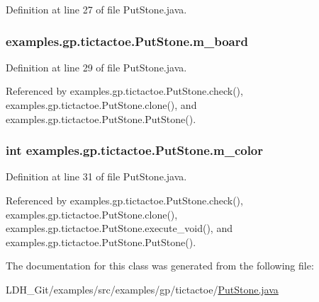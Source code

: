 Definition at line 27 of file Put\-Stone.\-java.

\hypertarget{classexamples_1_1gp_1_1tictactoe_1_1_put_stone_a2247515eb23f68385264f0d1a10c12cd}{
\subsubsection[{m\-\_\-board}]{ examples.\-gp.\-tictactoe.\-Put\-Stone.\-m\-\_\-board\hspace{0.3cm}{\ttfamily [private]}}}\label{classexamples_1_1gp_1_1tictactoe_1_1_put_stone_a2247515eb23f68385264f0d1a10c12cd}


Definition at line 29 of file Put\-Stone.\-java.



Referenced by examples.\-gp.\-tictactoe.\-Put\-Stone.\-check(), examples.\-gp.\-tictactoe.\-Put\-Stone.\-clone(), and examples.\-gp.\-tictactoe.\-Put\-Stone.\-Put\-Stone().

\hypertarget{classexamples_1_1gp_1_1tictactoe_1_1_put_stone_ab0037ec9918c65cfa484d2a0d265518e}{
\subsubsection[{m\-\_\-color}]{\setlength{\rightskip}{0pt plus 5cm}int examples.\-gp.\-tictactoe.\-Put\-Stone.\-m\-\_\-color\hspace{0.3cm}{\ttfamily [private]}}}\label{classexamples_1_1gp_1_1tictactoe_1_1_put_stone_ab0037ec9918c65cfa484d2a0d265518e}


Definition at line 31 of file Put\-Stone.\-java.



Referenced by examples.\-gp.\-tictactoe.\-Put\-Stone.\-check(), examples.\-gp.\-tictactoe.\-Put\-Stone.\-clone(), examples.\-gp.\-tictactoe.\-Put\-Stone.\-execute\-\_\-void(), and examples.\-gp.\-tictactoe.\-Put\-Stone.\-Put\-Stone().



The documentation for this class was generated from the following file\-:\begin{DoxyCompactItemize}
\item 
L\-D\-H\-\_\-\-Git/examples/src/examples/gp/tictactoe/\hyperlink{_put_stone_8java}{Put\-Stone.\-java}\end{DoxyCompactItemize}
